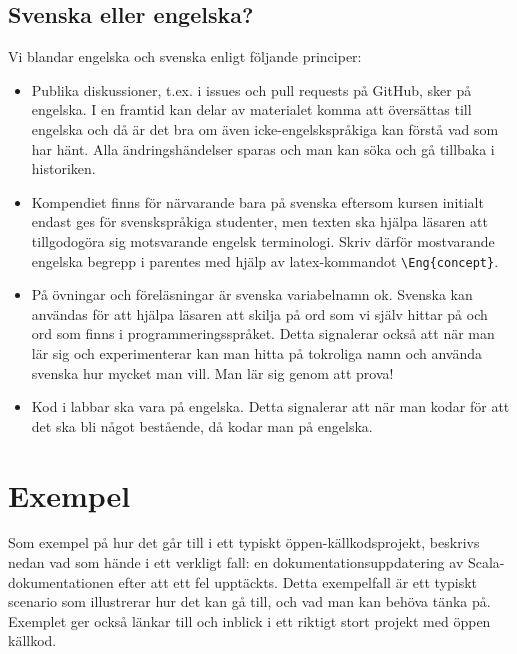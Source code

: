 \subsection*{Svenska eller engelska?}

Vi blandar engelska och svenska enligt följande principer:

\begin{itemize}

\item Publika diskussioner, t.ex. i issues och pull requests på GitHub, sker på engelska. I en  framtid kan delar av materialet komma att översättas till engelska och då är det bra om även icke-engelskspråkiga kan förstå vad som har hänt. Alla ändringshändelser sparas och man kan söka och gå tillbaka i historiken.

\item Kompendiet finns för närvarande bara på svenska eftersom kursen initialt endast ges för svenskspråkiga studenter, men texten ska hjälpa läsaren att tillgodogöra sig motsvarande engelsk terminologi. Skriv därför mostvarande engelska begrepp  i parentes med hjälp av latex-kommandot \verb+\Eng{concept}+.

\item På övningar och föreläsningar är svenska variabelnamn ok. Svenska kan användas för att hjälpa läsaren att skilja på ord som vi själv hittar på och ord som finns i programmeringsspråket. Detta signalerar också att när man lär sig och experimenterar kan man hitta på tokroliga namn och använda svenska hur mycket man vill. Man lär sig genom att prova!

\item Kod i labbar ska vara på engelska. Detta signalerar att när man kodar för att det ska bli något bestående, då kodar man på engelska.

\end{itemize}

\section*{Exempel}

Som exempel på hur det går till i ett typiskt öppen-källkodsprojekt, beskrivs nedan vad som hände i ett verkligt fall: en dokumentationsuppdatering av Scala-dokumentationen efter att ett fel upptäckts. Detta exempelfall är ett typiskt scenario som illustrerar hur det kan gå till, och vad man kan behöva tänka på. Exemplet ger också länkar till och inblick i ett riktigt stort projekt med öppen källkod.

